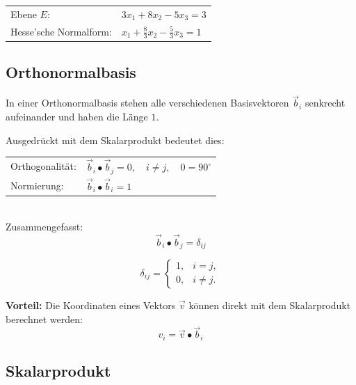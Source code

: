 \renewcommand{\arraystretch}{1.5}
\begin{tabular}{ll}
	Ebene $E$: 				& $3 x_1 + 8 x_2 - 5 x_3 = 3$ 					\\
	Hesse'sche Normalform: 	& $x_1 + \frac{8}{3} x_2 - \frac{5}{3} x_3 = 1$
\end{tabular}
\renewcommand{\arraystretch}{1}
		

\subsection{Orthonormalbasis}
\label{Orthonormalbasis}

In einer Orthonormalbasis stehen alle verschiedenen Basisvektoren
$\vec{b}_i$ senkrecht aufeinander und haben die Länge $1$.

Ausgedrückt mit dem Skalarprodukt bedeutet dies:
\vspace{0.2cm}

\begin{tabular}{ll}
    Orthogonalität: &
    $\vec{b}_i \bullet \vec{b}_j = 0,\quad i \neq j, \quad 0 = 90^\circ$ \\
    Normierung: &
    $\vec{b}_i \bullet \vec{b}_i = 1$
\end{tabular}
\vspace{0.2cm}\\
Zusammengefasst:
\[
\vec{b}_i \bullet \vec{b}_j = \delta_{ij}
\]

\[
\delta_{ij} =
\begin{cases}
1, & i = j,\\
0, & i \neq j.
\end{cases}
\]
\vspace{0.2cm}

\textbf{Vorteil:} Die Koordinaten eines Vektors $\vec{v}$ können
direkt mit dem Skalarprodukt berechnet werden:
\[
v_i = \vec{v} \bullet \vec{b}_i
\]

\columnbreak


\subsection{Skalarprodukt}

